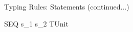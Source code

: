 \begin{frame}{Typing Rules: Statements (continued...)}
	\begin{mathpar}
			{\Gamma \vdash SEQ \:s_1 \:s_2 \in TUnit }
	\end{mathpar}
\end{frame}